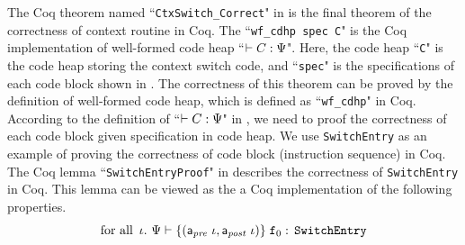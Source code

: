 The Coq theorem named ``{\tt CtxSwitch\_Correct}" in 
\Fig{\ref{fig:Coq code Example}} is the final theorem of 
the correctness of context routine in Coq.
The ``{\tt wf\_cdhp spec C}" is the  
Coq implementation of well-formed code heap 
``$\vdash {C} : {\Psi}$". Here, the code heap 
``{\tt C}" is the code heap storing the context 
switch code, and ``{\tt spec}" is the specifications 
of each code block shown in 
\Fig{\ref{fig:The Structure of Context Switch Module}}. 
The correctness of this theorem can be proved by the 
definition of well-formed code heap, which is defined 
as ``{\tt wf\_cdhp}" in Coq. According to the 
definition of ``$\vdash {C} : {\Psi}$" in 
\Fig{\ref{fig:Seleted Inference rules}}, we need to 
proof the correctness of each code block given specification 
in code heap. We use \texttt{SwitchEntry} as an example 
of proving the correctness of code block 
(instruction sequence) in Coq. 
The Coq lemma ``\texttt{SwitchEntryProof}" in 
\Fig{\ref{fig:Coq code Example}}
describes the correctness of \texttt{SwitchEntry} 
in Coq. This lemma can be viewed as the a Coq implementation 
of the following properties. 
\[
    \text{for all } \, \lgvl. \ 
    \wfcblk{\apre \ \lgvl}{\apost \ \lgvl}{\lab{0}}
        {\texttt{SwitchEntry}}
\]
